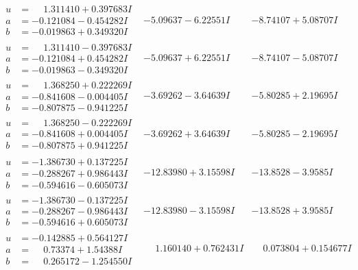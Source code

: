 \documentclass[1p]{elsarticle_modified}
\theoremstyle{definition}
\begin{document}
$$\begin{array}{c|c|c}
\begin{aligned}
u &= \phantom{-}1.311410 + 0.397683 I \\
a &= -0.121084 - 0.454282 I \\
b &= -0.019863 + 0.349320 I\end{aligned}
 & -5.09637 - 6.22551 I & -8.74107 + 5.08707 I \\ \hline\begin{aligned}
u &= \phantom{-}1.311410 - 0.397683 I \\
a &= -0.121084 + 0.454282 I \\
b &= -0.019863 - 0.349320 I\end{aligned}
 & -5.09637 + 6.22551 I & -8.74107 - 5.08707 I \\ \hline\begin{aligned}
u &= \phantom{-}1.368250 + 0.222269 I \\
a &= -0.841608 - 0.004405 I \\
b &= -0.807875 - 0.941225 I\end{aligned}
 & -3.69262 - 3.64639 I & -5.80285 + 2.19695 I \\ \hline\begin{aligned}
u &= \phantom{-}1.368250 - 0.222269 I \\
a &= -0.841608 + 0.004405 I \\
b &= -0.807875 + 0.941225 I\end{aligned}
 & -3.69262 + 3.64639 I & -5.80285 - 2.19695 I \\ \hline\begin{aligned}
u &= -1.386730 + 0.137225 I \\
a &= -0.288267 + 0.986443 I \\
b &= -0.594616 - 0.605073 I\end{aligned}
 & -12.83980 + 3.15598 I & -13.8528 - 3.9585 I \\ \hline\begin{aligned}
u &= -1.386730 - 0.137225 I \\
a &= -0.288267 - 0.986443 I \\
b &= -0.594616 + 0.605073 I\end{aligned}
 & -12.83980 - 3.15598 I & -13.8528 + 3.9585 I \\ \hline\begin{aligned}
u &= -0.142885 + 0.564127 I \\
a &= \phantom{-}0.73374 + 1.54388 I \\
b &= \phantom{-}0.265172 - 1.254550 I\end{aligned}
 & \phantom{-}1.160140 + 0.762431 I & \phantom{-}0.073804 + 0.154677 I \\ \hline\begin{aligned}

\end{aligned}
\end{array}$$
\end{document}
